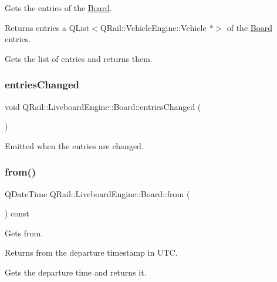 Gets the entries of the \mbox{\hyperlink{classQRail_1_1LiveboardEngine_1_1Board}{Board}}. 

\begin{DoxyReturn}{Returns}
entries a Q\+List$<$\+Q\+Rail\+::\+Vehicle\+Engine\+::\+Vehicle $\ast$$>$ of the \mbox{\hyperlink{classQRail_1_1LiveboardEngine_1_1Board}{Board}} entries.
\end{DoxyReturn}
Gets the list of entries and returns them. \mbox{\label{classQRail_1_1LiveboardEngine_1_1Board_a6a08cd7c9e73e7b9892858d26066c1d8}} 
\subsubsection{\texorpdfstring{entriesChanged}{entriesChanged}}
{\footnotesize\ttfamily void Q\+Rail\+::\+Liveboard\+Engine\+::\+Board\+::entries\+Changed (\begin{DoxyParamCaption}{ }\end{DoxyParamCaption})\hspace{0.3cm}{\ttfamily [signal]}}



Emitted when the entries are changed. 

\mbox{\label{classQRail_1_1LiveboardEngine_1_1Board_a503aaa8cea63f129e08581a49e308479}} 
\subsubsection{\texorpdfstring{from()}{from()}}
{\footnotesize\ttfamily Q\+Date\+Time Q\+Rail\+::\+Liveboard\+Engine\+::\+Board\+::from (\begin{DoxyParamCaption}{ }\end{DoxyParamCaption}) const}



Gets from. 

\begin{DoxyReturn}{Returns}
from the departure timestamp in U\+TC.
\end{DoxyReturn}
Gets the departure time and returns it. \mbox{\label{classQRail_1_1LiveboardEngine_1_1Board_ae036b6efe4d807d6679a7f6b92f18b28}} 
